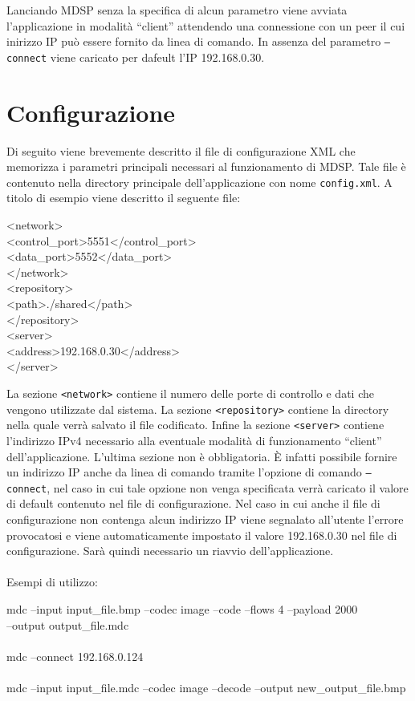 Lanciando MDSP senza la specifica di alcun parametro viene avviata
l'applicazione in modalità ``client'' attendendo una connessione con un peer
il cui inirizzo IP può essere fornito da linea di comando. In assenza del
parametro \texttt{--connect} viene caricato per dafeult l'IP 192.168.0.30.

\section{Configurazione}
Di seguito viene brevemente descritto il file di configurazione XML che
memorizza i parametri principali necessari al funzionamento di MDSP. Tale file
è contenuto nella directory principale dell'applicazione con nome
\texttt{config.xml}. A titolo di esempio viene descritto il seguente file:

\begin{code}
<network>\\
    <control\_port>5551</control\_port>\\
    <data\_port>5552</data\_port>\\
</network>\\
<repository>\\
    <path>./shared</path>\\
</repository>\\
<server>\\
    <address>192.168.0.30</address>\\
</server>\\
\end{code}

La sezione \texttt{<network>} contiene il numero delle porte di controllo e
dati che vengono utilizzate dal sistema. La sezione \texttt{<repository>}
contiene la directory nella quale verrà salvato il file codificato. Infine la
sezione \texttt{<server>} contiene l'indirizzo IPv4 necessario alla eventuale
modalità di funzionamento ``client'' dell'applicazione. L'ultima sezione
non è obbligatoria. \`E infatti possibile fornire un indirizzo IP anche da
linea di comando tramite l'opzione di comando \texttt{--connect}, nel caso in
cui tale opzione non venga specificata verrà caricato il valore di default
contenuto nel file di configurazione. Nel caso in cui anche il file di
configurazione non contenga alcun indirizzo IP viene segnalato all'utente
l'errore provocatosi e viene automaticamente impostato il valore 192.168.0.30
nel file di configurazione. Sarà quindi necessario un riavvio dell'applicazione.
\\\\
Esempi di utilizzo:

\begin{code}
mdc --input input\_file.bmp --codec image --code --flows 4 --payload
2000\\ --output output\_file.mdc\\\\
mdc --connect 192.168.0.124\\\\
mdc --input input\_file.mdc --codec image --decode --output
new\_output\_file.bmp
\end{code}